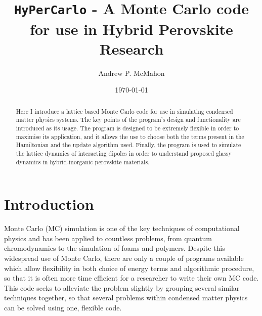 \documentclass[aps,prb,twocolumn,showpacs,superscriptaddress,floatfix]{revtex4-1}
\begin{document}
\title{{\tt HyPerCarlo} -  A Monte Carlo code for use in Hybrid Perovskite Research}

\author{Andrew P. McMahon} 

\date{\today}




\begin{abstract} 
Here I introduce a lattice based Monte Carlo code for use in simulating condensed matter physics systems. The key points of the program's design and functionality are introduced as its usage. The program is designed to be extremely flexible in order to maximise its application, and it allows the use to choose both the terms present in the Hamiltonian and the update algorithm used. Finally, the program is used to simulate the lattice dynamics of interacting dipoles in order to understand proposed glassy dynamics in hybrid-inorganic perovskite materials.
\end{abstract}
\pacs{}
\maketitle
 \section{Introduction}
Monte Carlo (MC) simulation is one of the key techniques of computational physics and has been applied to countless problems, from quantum chromodynamics to the simulation of foams and polymers. Despite this widespread use of Monte Carlo, there are only a couple of programs available which allow flexibility in both choice of energy terms and algorithmic procedure, so that it is often more time efficient for a researcher to write their own MC code. This code seeks to alleviate the problem slightly by grouping several similar techniques together, so that several problems within condensed matter physics can be solved using one, flexible code.
\end{document}
